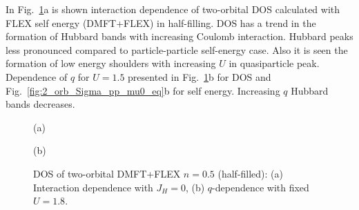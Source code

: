 In Fig.~\ref{fig:2_orb_DOS_FLEX_mu0_eq}a is shown interaction dependence of two-orbital DOS calculated with FLEX self energy (DMFT+FLEX) in half-filling. DOS has a trend in the formation of Hubbard bands with increasing Coulomb interaction. Hubbard peaks less pronounced compared to particle-particle self-energy case. Also it is seen the formation of low energy shoulders with increasing $U$ in quasiparticle peak. Dependence of $q$ for $U=1.5$ presented in Fig.~\ref{fig:2_orb_DOS_FLEX_mu0_eq}b for DOS and Fig.~\ref{fig:2_orb_Sigma_pp_mu0_eq}b for self energy. Increasing $q$ Hubbard bands decreases. 
\begin{figure}[h!]
\begin{minipage}[h]{0.5\linewidth}
 (a) \\
\end{minipage}
\hfill
\begin{minipage}[h]{0.5\linewidth}
 (b) \\
\end{minipage}
\caption{DOS of two-orbital DMFT+FLEX $n=0.5$ (half-filled): (a) Interaction dependence with $J_{H}=0$, (b) $q$-dependence with fixed $U=1.8$.}
\label{fig:2_orb_DOS_FLEX_mu0_eq}
\end{figure}

